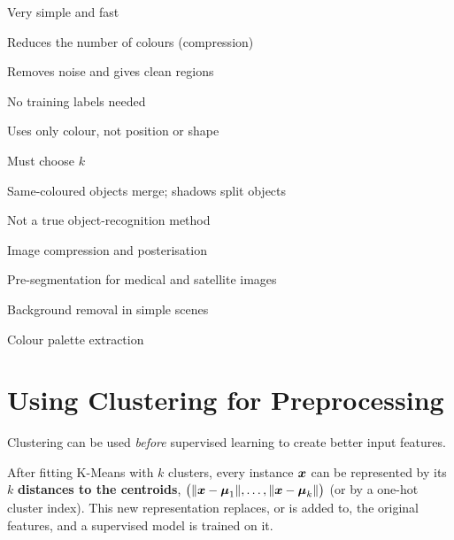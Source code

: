 {\item Very simple and fast
 \item Reduces the number of colours (compression)
 \item Removes noise and gives clean regions
 \item No training labels needed}
{\item Uses only colour, not position or shape
 \item Must choose $k$
 \item Same-coloured objects merge; shadows split objects
 \item Not a true object-recognition method}
{\item Image compression and posterisation
 \item Pre-segmentation for medical and satellite images
 \item Background removal in simple scenes
 \item Colour palette extraction}

\section{Using Clustering for Preprocessing}\label{sec:pre}

Clustering can be used \emph{before} supervised learning to create better input features.

\begin{definition}
After fitting K-Means with $k$ clusters, every instance $\boldsymbol{x}$ can be represented by its $k$ \textbf{distances to the centroids}, $\big(\|\boldsymbol{x}-\boldsymbol{\mu}_1\|,\dots,\|\boldsymbol{x}-\boldsymbol{\mu}_k\|\big)$ (or by a one-hot cluster index). This new representation replaces, or is added to, the original features, and a supervised model is trained on it.
\end{definition}

